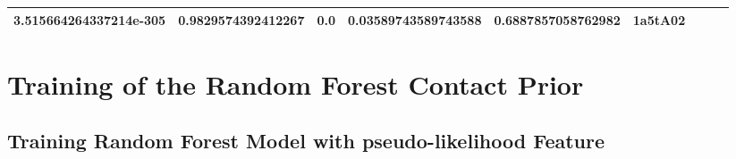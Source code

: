 \documentclass[11pt,a4paper,twoside]{book}
\theoremstyle{definition}
\theoremstyle{definition}
\theoremstyle{remark}
\begin{document}
\begin{longtable}[]{@{}lllllllll@{}}
\begin{minipage}[t]{0.04\columnwidth}
3.515664264337214e-305\strut
\end{minipage} & \begin{minipage}[t]{0.04\columnwidth}\raggedright\strut
0.9829574392412267\strut
\end{minipage} & \begin{minipage}[t]{0.04\columnwidth}\raggedright\strut
0.0\strut
\end{minipage} & \begin{minipage}[t]{0.04\columnwidth}\raggedright\strut
0.03589743589743588\strut
\end{minipage} & \begin{minipage}[t]{0.04\columnwidth}\raggedright\strut
0.6887857058762982\strut
\end{minipage} & \begin{minipage}[t]{0.04\columnwidth}\raggedright\strut
1a5tA02\strut
\end{minipage}\tabularnewline
\bottomrule
\end{longtable}

\chapter{Training of the Random Forest Contact
Prior}\label{training-of-the-random-forest-contact-prior}

\section{Training Random Forest Model with pseudo-likelihood
Feature}\label{training-random-forest-model-with-pseudo-likelihood-feature}
\end{document}
